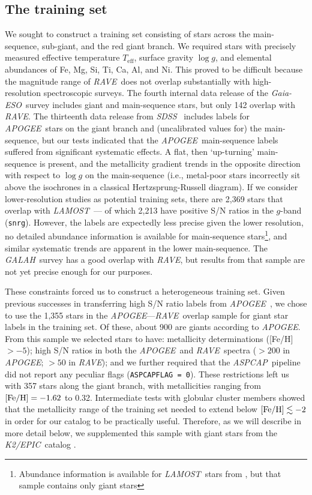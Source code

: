 \documentclass[preprint,trackchanges]{aastex}
\newcommand{\acronym}[1]{{\small{#1}}}
\newcommand{\project}[1]{\textsl{#1}}
\newcommand{\rave}{\project{\acronym{RAVE}}}
\newcommand{\galah}{\project{\acronym{GALAH}}}
\newcommand{\ges}{\project{Gaia-ESO}}
\newcommand{\apogee}{\project{\acronym{APOGEE}}}
\newcommand{\aspcap}{\project{\acronym{ASPCAP}}}
\newcommand{\lamost}{\project{\acronym{LAMOST}}}
\newcommand{\epic}{\project{K2/EPIC}}
\newcommand{\sdss}{\project{\acronym{SDSS}}}
\newcommand{\teff}{T_{\mathrm{eff}}}
\newcommand{\logg}{\log g}
\begin{document}
\subsection{The training set}
\label{sec:the-training-set}


We sought to construct a training set consisting of stars across the main-sequence,
sub-giant, and the red giant branch.  We required stars with precisely measured
effective temperature $\teff$, surface gravity $\logg$, and elemental abundances
of Fe, Mg, Si, Ti, Ca, Al, and Ni.  This proved to be difficult because the magnitude
range of \rave\ does not overlap substantially with high-resolution spectroscopic
surveys.  The fourth internal data release of the \ges\ survey includes 
giant and main-sequence stars, but only 142 overlap with \rave.  The thirteenth data 
release from \sdss\ \citep{sloan_dr13} includes labels for \apogee\ stars on the
giant branch and (uncalibrated values for) the main-sequence, but our tests indicated
that the \apogee\ main-sequence labels suffered from significant systematic effects.  A flat, 
then `up-turning' main-sequence is present, and the metallicity gradient trends in 
the opposite direction with respect to $\logg$ on the main-sequence (i.e., metal-poor
stars incorrectly sit above the isochrones in a classical Hertzsprung-Russell diagram).
If we consider lower-resolution studies as potential training sets, there are 2,369
stars that overlap with \lamost\ --- of which 2,213 have positive S/N ratios in the 
$g$-band (\texttt{snrg}).  However, the labels are expectedly less precise given the
lower resolution, no detailed abundance information is available for main-sequence 
stars\footnote{Abundance information is available for \lamost\ stars from \citet{Ho_2016},
but that sample contains only giant stars}, and similar systematic trends are apparent
in the lower main-sequence.  The \galah\ survey has a good overlap with \rave, but 
results from that sample are not yet precise enough for our purposes.


These constraints forced us to construct a heterogeneous training set.  Given previous
successes in transferring high S/N ratio labels from \apogee\ \citep{Ness_2015,
Ness_2016,Ho_2016,Casey_2016b}, we chose to use the 1,355 stars in the \apogee---\rave\ 
overlap sample for giant star labels in the training set.  Of these, about 900 are 
giants according to \apogee.  From this sample we selected stars to have: metallicity
determinations ([Fe/H] $> -5$); high S/N ratios in both the \apogee\ and \rave\ spectra
($>200$ in \apogee; $>50$ in \rave); and we further required that the \aspcap\ pipeline 
did not report any peculiar flags (\texttt{ASPCAPFLAG = 0}).  These restrictions left 
us with 357 stars along the giant branch, with metallicities ranging from 
$[{\rm Fe/H}] = -1.62$ to 0.32.  Intermediate tests with globular cluster members showed
that the metallicity range of the training set needed to extend below 
$[{\rm Fe/H}] \lesssim -2$ in order for our catalog to be practically useful.
Therefore, as we will describe in more detail below, we supplemented this sample with 
giant stars from the \epic\ catalog \citep{Huber_2016}.
\end{document}
